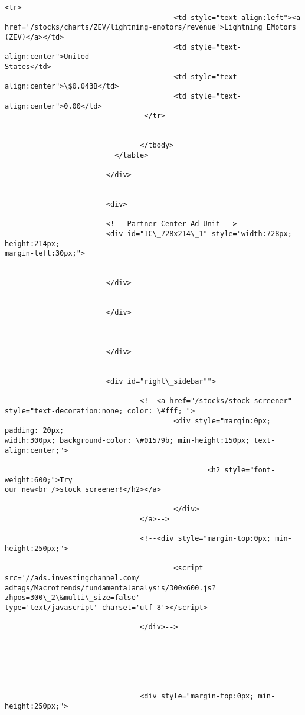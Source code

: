 \documentclass[11pt]{article}
\begin{document}
\begin{Verbatim}[commandchars=\\\{\}]
                                <tr>
                                        <td style="text-align:left"><a
href='/stocks/charts/ZEV/lightning-emotors/revenue'>Lightning EMotors
(ZEV)</a></td>
                                        <td style="text-align:center">United
States</td>
                                        <td style="text-
align:center">\$0.043B</td>
                                        <td style="text-align:center">0.00</td>
                                 </tr>


                                </tbody>
                          </table>

                        </div>


                        <div>

                        <!-- Partner Center Ad Unit -->
                        <div id="IC\_728x214\_1" style="width:728px; height:214px;
margin-left:30px;">


                        </div>


                        </div>



                        </div>


                        <div id="right\_sidebar"">

                                <!--<a href="/stocks/stock-screener"
style="text-decoration:none; color: \#fff; ">
                                        <div style="margin:0px; padding: 20px;
width:300px; background-color: \#01579b; min-height:150px; text-align:center;">

                                                <h2 style="font-weight:600;">Try
our new<br />stock screener!</h2></a>

                                        </div>
                                </a>-->

                                <!--<div style="margin-top:0px; min-
height:250px;">

                                        <script src='//ads.investingchannel.com/
adtags/Macrotrends/fundamentalanalysis/300x600.js?zhpos=300\_2\&multi\_size=false'
type='text/javascript' charset='utf-8'></script>

                                </div>-->






                                <div style="margin-top:0px; min-height:250px;">


\end{Verbatim}
\end{document}
